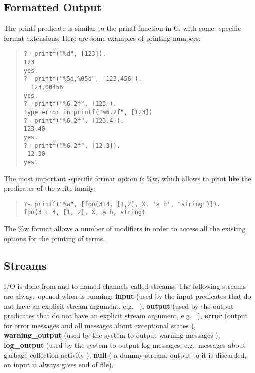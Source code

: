 \subsection{Formatted Output}
The printf-predicate is similar to the printf-function in C, with some
\eclipse{}-specific format extensions.
Here are some examples of printing numbers:
\begin{quote}\begin{verbatim}
?- printf("%d", [123]).
123
yes.
?- printf("%5d,%05d", [123,456]).
  123,00456
yes.
?- printf("%6.2f", [123]).
type error in printf("%6.2f", [123])
?- printf("%6.2f", [123.4]).
123.40
yes.
?- printf("%6.2f", [12.3]).
 12.30
yes.
\end{verbatim}\end{quote}
The most important \eclipse{}-specific format option is \%w, which
allows to print like the predicates of the write-family:
\begin{quote}\begin{verbatim}
?- printf("%w", [foo(3+4, [1,2], X, 'a b', "string")]).
foo(3 + 4, [1, 2], X, a b, string)
\end{verbatim}\end{quote}
The \%w format allows a number of modifiers in order to access all the
existing options for the printing of \eclipse{} terms.



\subsection{Streams}

\eclipse{} I/O is done from and to named channels called streams. 
The following streams are always opened when \eclipse{} is running:
{\bf input} (used by the input predicates that do not have
an explicit stream argument, e.g.\ 
),
{\bf output} (used by the output predicates that do not have
an explicit stream argument, e.g.\ 
),
{\bf error} (output for error messages and all messages about exceptional states
),
{\bf warning_output} (used by the system to output warning messages
),
{\bf log_output} (used by the system to output log messages, e.g.\ messages about garbage
collection activity
),
{\bf null} (
a dummy stream, output to it is discarded, on input it always
gives end of file).

